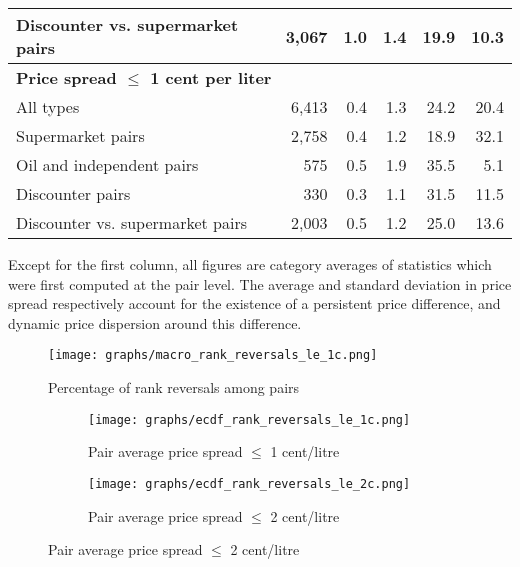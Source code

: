 \documentclass[english]{article}
\begin{document}
\begin{table}[H]
\begin{threeparttable}
\begin{tabular}{lrrrrr}
Discounter vs. supermarket pairs & 3,067 & 1.0   & 1.4   & 19.9  & 10.3 \\
\hline
\multicolumn{2}{l}{\textbf{Price spread $\le$ 1 cent per liter}} &       &       &       &  \\
All types & 6,413 & 0.4   & 1.3   & 24.2  & 20.4 \\
Supermarket pairs & 2,758 & 0.4   & 1.2   & 18.9  & 32.1 \\
Oil and independent pairs & 575   & 0.5   & 1.9   & 35.5  & 5.1 \\
Discounter pairs & 330   & 0.3   & 1.1   & 31.5  & 11.5 \\
Discounter vs. supermarket pairs & 2,003 & 0.5   & 1.2   & 25.0  & 13.6 \\
\hline
\hline
\end{tabular}
\begin{tablenotes}
			\small
      \item Except for the first column, all figures are category averages of statistics which were first computed at the pair level. The average and standard deviation in price spread respectively account for the existence of a persistent price difference, and dynamic price dispersion around this difference.
\end{tablenotes}
\end{threeparttable}
\end{table}

\begin{figure}[H]
    \caption{Percentage of rank reversals among pairs}
	\centering
		\texttt{[image: graphs/macro\_rank\_reversals\_le\_1c.png]}
\end{figure}

\begin{figure}[H]
\centering
\caption{Empirical distribution functions of rank reversals (raw prices)}
\begin{subfigure}{.49\textwidth}
\centering
\texttt{[image: graphs/ecdf\_rank\_reversals\_le\_1c.png]}
\caption[short]{Pair average price spread $\le$ 1 cent/litre}
\end{subfigure}
\begin{subfigure}{.49\textwidth}
\centering
\texttt{[image: graphs/ecdf\_rank\_reversals\_le\_2c.png]}
\caption[short]{Pair average price spread $\le$ 2 cent/litre}
\end{subfigure}
\end{figure}
\end{document}
